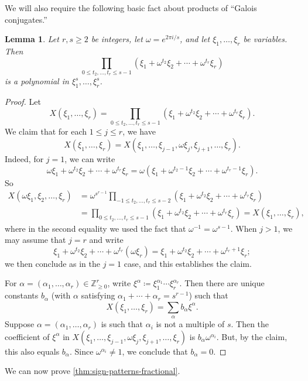 \documentclass[11pt]{amsart}
\newtheorem{lemma}[theorem]{Lemma}
\theoremstyle{definition}
\begin{document}
We will also require the following basic fact about products of ``Galois conjugates.''

\begin{lemma}\label{lem:galois}
Let $r,s \geq 2$ be integers, let $\omega=e^{2\pi i/s}$, and let $\xi_1,\ldots,\xi_r$ be variables.  Then
\[\prod_{0 \leq t_2,\ldots, t_r \leq s-1} (\xi_1+\omega^{t_2} \xi_2+\cdots+\omega^{t_r}\xi_r)\] is a polynomial in $\xi_1^s, \ldots, \xi_r^s$.
\end{lemma}

\begin{proof}
Let
\[X(\xi_1, \ldots, \xi_r)=\prod_{0 \leq t_2,\ldots, t_r \leq s-1} (\xi_1+\omega^{t_2} \xi_2+\cdots+\omega^{t_r}\xi_r).\]
We claim that for each $1 \leq j \leq r$, we have
\[X(\xi_1, \ldots, \xi_r)=X(\xi_1, \ldots, \xi_{j-1}, \omega \xi_j, \xi_{j+1}, \ldots, \xi_r).\]
Indeed, for $j=1$, we can write \[\omega\xi_1+\omega^{t_2} \xi_2+\cdots+\omega^{t_r}\xi_r=\omega(\xi_1+\omega^{t_2-1} \xi_2+\cdots+\omega^{t_r-1}\xi_r).\]
So
\begin{align*}
X(\omega\xi_1, \xi_2, \ldots, \xi_r) &=\omega^{s^{r-1}} \prod_{-1 \leq t_2,\ldots, t_r \leq s-2} (\xi_1+\omega^{t_2} \xi_2+\cdots+\omega^{t_r}\xi_r)\\
 &=\prod_{0 \leq t_2,\ldots, t_r \leq s-1} (\xi_1+\omega^{t_2} \xi_2+\cdots+\omega^{t_r}\xi_r)=X(\xi_1, \ldots, \xi_r), 
\end{align*}
where in the second equality we used the fact that $\omega^{-1}=\omega^{s-1}$.
When $j>1$, we may assume that $j=r$ and write
\[\xi_1+\omega^{t_2} \xi_2+\cdots+\omega^{t_r}(\omega\xi_r)=\xi_1+\omega^{t_2} \xi_2+\cdots+\omega^{t_r+1}\xi_r;\]
we then conclude as in the $j=1$ case, and this establishes the claim.

For $\alpha=(\alpha_1, \ldots, \alpha_r) \in \mathbb{Z}_{\geq 0}^r$, write $\xi^\alpha\coloneqq\xi_1^{\alpha_1} \cdots \xi_r^{\alpha_r}$.  Then there are unique constants $b_\alpha$ (with $\alpha$ satisfying $\alpha_1+\cdots+\alpha_r=s^{r-1}$) such that
\[X(\xi_1, \ldots, \xi_r)=\sum_{\alpha} b_\alpha \xi^\alpha.\]
Suppose $\alpha=(\alpha_1, \ldots, \alpha_r)$ is such that $\alpha_i$ is not a multiple of $s$.  Then the coefficient of $\xi^\alpha$ in $X(\xi_1, \ldots, \xi_{j-1}, \omega \xi_j, \xi_{j+1}, \ldots, \xi_r)$ is $b_\alpha \omega^{\alpha_i}$.  But, by the claim, this also equals $b_\alpha$.  Since $\omega^{\alpha_i} \neq 1$, we conclude that $b_\alpha=0$.
\end{proof}

We can now prove \cref{thm:sign-patterns-fractional}.
\end{document}
